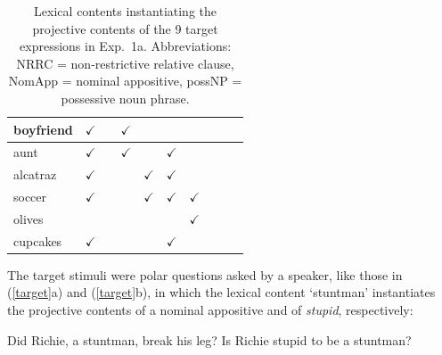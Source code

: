 \documentclass[11pt,fleqn]{article}
\newcommand{\6}{\mbox{$[\hspace*{-.6mm}[$}}
\newcommand{\9}{\mbox{$]\hspace*{-.6mm}]$}}
\begin{document}
\begin{table}[!h]
\begin{center}
\begin{tabular}{l|ccccccccc}
boyfriend & $\checkmark$ & & $\checkmark$ & & & & & &  \\

\hline

aunt & $\checkmark$ & & $\checkmark$ & & $\checkmark$ & & & &  \\

\hline

alcatraz & $\checkmark$ & & & $\checkmark$ & $\checkmark$ & & & &  \\

\hline

soccer & $\checkmark$ & & & $\checkmark$ & $\checkmark$ & $\checkmark$ & & &  \\

\hline

olives & & & & & & $\checkmark$ & & &  \\

\hline

cupcakes & $\checkmark$ & & & & $\checkmark$ & & & &  \\

\hline

\end{tabular}
\end{center}
\caption{Lexical contents instantiating the projective contents of the 9 target expressions in Exp.~1a. Abbreviations: NRRC = non-restrictive relative clause, NomApp = nominal appositive, possNP = possessive noun phrase.}\label{t-trigger-content-pairs}
\end{table}

\newpage

The target stimuli were polar questions asked by a speaker, like those in (\ref{target}a) and (\ref{target}b), in which the lexical content `stuntman' instantiates the projective contents of a nominal appositive and of {\em stupid}, respectively:

\begin{exe}
\ex\label{target}
\begin{xlist}
\ex Did Richie, a stuntman, break his leg?
\ex Is Richie stupid to be a stuntman?
\end{xlist}
\end{exe}
\end{document}
